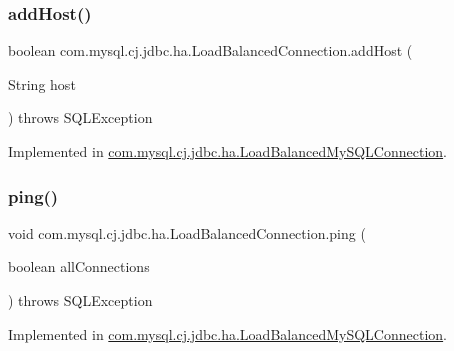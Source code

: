 \subsubsection{\texorpdfstring{add\+Host()}{addHost()}}
{\footnotesize\ttfamily boolean com.\+mysql.\+cj.\+jdbc.\+ha.\+Load\+Balanced\+Connection.\+add\+Host (\begin{DoxyParamCaption}\item[{String}]{host }\end{DoxyParamCaption}) throws S\+Q\+L\+Exception}



Implemented in \mbox{\hyperlink{classcom_1_1mysql_1_1cj_1_1jdbc_1_1ha_1_1_load_balanced_my_s_q_l_connection_affe5003f09c7d3e9fba41cf93dbe77ad}{com.\+mysql.\+cj.\+jdbc.\+ha.\+Load\+Balanced\+My\+S\+Q\+L\+Connection}}.

\mbox{\label{interfacecom_1_1mysql_1_1cj_1_1jdbc_1_1ha_1_1_load_balanced_connection_a25239c6d5650eed007db3f8a12ba3e6f}} 
\subsubsection{\texorpdfstring{ping()}{ping()}}
{\footnotesize\ttfamily void com.\+mysql.\+cj.\+jdbc.\+ha.\+Load\+Balanced\+Connection.\+ping (\begin{DoxyParamCaption}\item[{boolean}]{all\+Connections }\end{DoxyParamCaption}) throws S\+Q\+L\+Exception}



Implemented in \mbox{\hyperlink{classcom_1_1mysql_1_1cj_1_1jdbc_1_1ha_1_1_load_balanced_my_s_q_l_connection_a62e8d4c1e4cea88eeb9b2c87d5f230c3}{com.\+mysql.\+cj.\+jdbc.\+ha.\+Load\+Balanced\+My\+S\+Q\+L\+Connection}}.

\mbox{\label{interfacecom_1_1mysql_1_1cj_1_1jdbc_1_1ha_1_1_load_balanced_connection_a41b452c0ebbd9f7dd3f8a8d6958df670}} 
